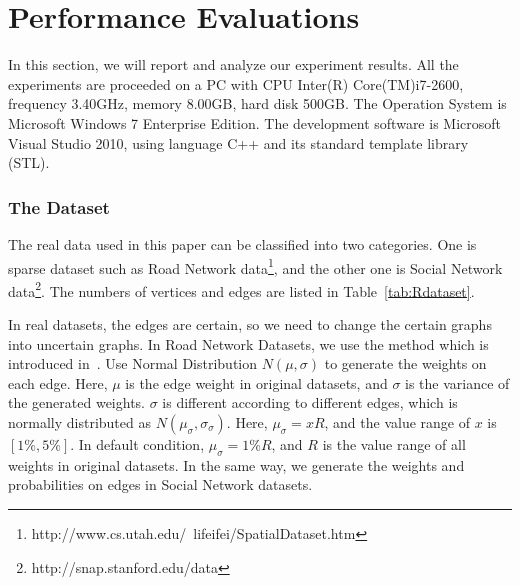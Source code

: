 \documentclass[runningheads,a4paper]{llncs}
\begin{document}
\vspace{-0.4cm}
\section{Performance Evaluations}
\label{sec:exp}
\vspace{-0.2cm}

In this section, we will report and analyze our experiment results. All the experiments are proceeded on a PC with CPU Inter(R) Core(TM)i7-2600, frequency 3.40GHz, memory 8.00GB, hard disk 500GB. The Operation System is Microsoft Windows 7 Enterprise Edition. The development software is Microsoft Visual Studio 2010, using language C++ and its standard template library (STL).

\vspace{-0.3cm}
\subsubsection{The Dataset}
\label{sec:exp:dataset}
\vspace{-0.1cm}

The real data used in this paper can be classified into two categories. One is sparse dataset such as Road Network data\footnote{http://www.cs.utah.edu/~lifeifei/SpatialDataset.htm}, and the other one is Social Network data\footnote{http://snap.stanford.edu/data}. The numbers of vertices and edges are listed in Table~\ref{tab:Rdataset}.

In real datasets, the edges are certain, so we need to change the certain graphs into uncertain graphs. In Road Network Datasets, we use the method which is introduced in~\cite{hua2010probabilistic}. Use Normal Distribution $N(\mu,\sigma)$ to generate the weights on each edge. Here, $\mu$ is the edge weight in original datasets, and $\sigma$ is the variance of the generated weights. $\sigma$ is different according to different edges, which is normally distributed as $N(\mu_\sigma,\sigma_\sigma)$. Here, $\mu_\sigma=xR$, and the value range of $x$ is $[1\%,5\%]$. In default condition, $\mu_\sigma=1\%R$, and $R$ is the value range of all weights in original datasets. In the same way, we generate the weights and probabilities on edges in Social Network datasets.
\end{document}
